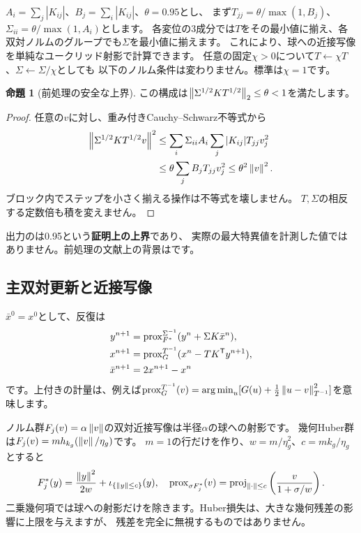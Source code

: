 \documentclass[a4paper,11pt]{ltjsarticle}
\newcommand{\prox}{\operatorname{prox}}\newcommand{\clip}{\operatorname{clip}}\newcommand{\proj}{\operatorname{proj}}
\theoremstyle{definition}
\newtheorem{proposition}[definition]{命題}\newtheorem{remark}[definition]{注意}
\begin{document}
$A_i=\sum_j|K_{ij}|$、$B_j=\sum_i|K_{ij}|$、$\theta=0.95$とし、
まず$T_{jj}=\theta/\max(1,B_j)$、$\Sigma_{ii}=\theta/\max(1,A_i)$とします。
各変位の3成分では$T$をその最小値に揃え、各双対ノルムのグループでも$\Sigma$を最小値に揃えます。
これにより、球への近接写像を単純なユークリッド射影で計算できます\cite{naganuma}。
任意の固定$\chi>0$について$T\leftarrow\chi T$、$\Sigma\leftarrow\Sigma/\chi$としても
以下のノルム条件は変わりません。標準は$\chi=1$です。

\begin{proposition}[前処理の安全な上界]\label{prop:steps}
この構成は$\left\lVert\Sigma^{1/2}KT^{1/2}\right\rVert_2\le\theta<1$を満たします。
\end{proposition}
\begin{proof}
任意の$v$に対し、重み付きCauchy--Schwarz不等式から
\begin{align*}
\left\lVert\Sigma^{1/2}KT^{1/2}v\right\rVert^2
 &\le\sum_i\Sigma_{ii}A_i\sum_j |K_{ij}|T_{jj}v_j^2\\
 &\le\theta\sum_j B_jT_{jj}v_j^2\le\theta^2\left\lVert v\right\rVert^2.
\end{align*}
ブロック内でステップを小さく揃える操作は不等式を壊しません。
$T,\Sigma$の相反する定数倍も積を変えません。
\end{proof}
出力のは0.95という\textbf{証明上の上界}であり、
実際の最大特異値を計測した値ではありません。前処理の文献上の背景は\cite{pock,naganuma}です。

\subsection{主双対更新と近接写像}
$\bar x^0=x^0$として、反復は
\begin{equation}\label{eq:pdhg}
\begin{split}
y^{n+1}&=\prox_{F^*}^{\Sigma^{-1}}(y^n+\Sigma K\bar x^n),\\
x^{n+1}&=\prox_G^{T^{-1}}(x^n-TK^\T y^{n+1}),\\
\bar x^{n+1}&=2x^{n+1}-x^n
\end{split}
\end{equation}
です。上付きの計量は、例えば$\prox_G^{T^{-1}}(v)=
\argmin_u[G(u)+\frac12\norm{u-v}_{T^{-1}}^2]$を意味します。

ノルム群$F_j(v)=\alpha\left\lVert v\right\rVert$の双対近接写像は半径$\alpha$の球への射影です。
幾何Huber群は$F_j(v)=m h_{k_g}(\left\lVert v\right\rVert/\eta_g)$です。
$m=1$の行だけを作り、$w=m/\eta_g^2$、$c=mk_g/\eta_g$とすると
\begin{equation}\label{eq:dual_huber}
F_j^*(y)=\frac{\norm{y}^2}{2w}+\iota_{\{\norm{y}\le c\}}(y),\quad
\prox_{\sigma F_j^*}(v)=\proj_{\norm{\cdot}\le c}\left(\frac{v}{1+\sigma/w}\right).
\end{equation}
二乗幾何項では球への射影だけを除きます。Huber損失は、大きな幾何残差の影響に上限を与えますが、
残差を完全に無視するものではありません。
\end{document}
